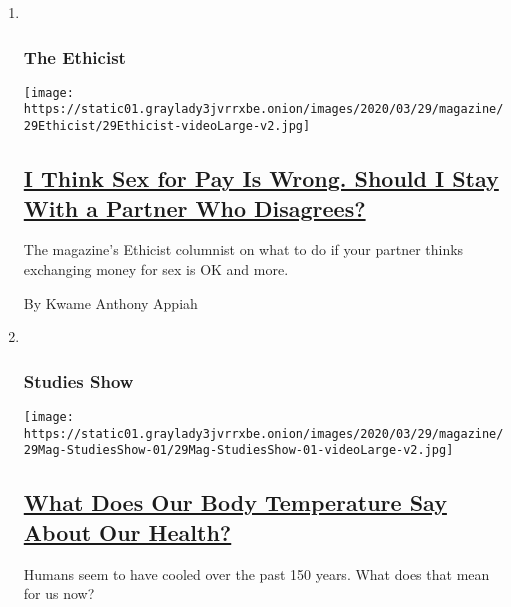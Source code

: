 \begin{enumerate}
\def\labelenumi{\arabic{enumi}.}
\item ~
  \hypertarget{the-ethicist}{%
  \subsubsection{The Ethicist}\label{the-ethicist}}

  \texttt{[image: https://static01.graylady3jvrrxbe.onion/images/2020/03/29/magazine/29Ethicist/29Ethicist-videoLarge-v2.jpg]}

  \hypertarget{i-think-sex-for-pay-is-wrong-should-i-stay-with-a-partner-who-disagrees}{%
  \subsection{\texorpdfstring{\href{/2020/03/24/magazine/i-think-sex-for-pay-is-wrong-should-i-stay-with-a-partner-who-disagrees.html}{I
  Think Sex for Pay Is Wrong. Should I Stay With a Partner Who
  Disagrees?}}{I Think Sex for Pay Is Wrong. Should I Stay With a Partner Who Disagrees?}}\label{i-think-sex-for-pay-is-wrong-should-i-stay-with-a-partner-who-disagrees}}

  The magazine's Ethicist columnist on what to do if your partner thinks
  exchanging money for sex is OK and more.

  By Kwame Anthony Appiah
\item ~
  \hypertarget{studies-show}{%
  \subsubsection{Studies Show}\label{studies-show}}

  \texttt{[image: https://static01.graylady3jvrrxbe.onion/images/2020/03/29/magazine/29Mag-StudiesShow-01/29Mag-StudiesShow-01-videoLarge-v2.jpg]}

  \hypertarget{what-does-our-body-temperature-say-about-our-health}{%
  \subsection{\texorpdfstring{\href{/2020/03/24/magazine/fever-body-temperature-coronavirus.html}{What
  Does Our Body Temperature Say About Our
  Health?}}{What Does Our Body Temperature Say About Our Health?}}\label{what-does-our-body-temperature-say-about-our-health}}

  Humans seem to have cooled over the past 150 years. What does that
  mean for us now?


\end{enumerate}
